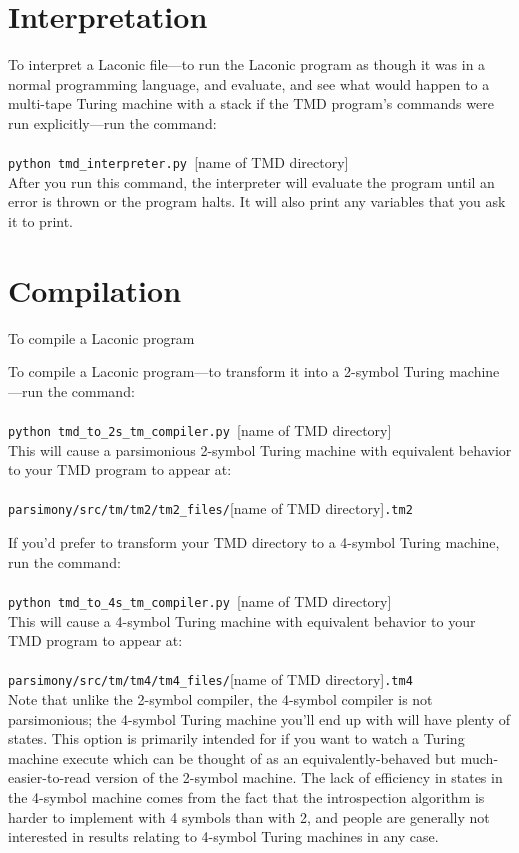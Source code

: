 \documentclass[11pt]{article}
\begin{document}
\section{Interpretation}

To interpret a Laconic file---to run the Laconic program as though it was in a normal programming language, and evaluate, and see what would happen to a multi-tape Turing machine with a stack if the TMD program's commands were run explicitly---run the command: \\ \\ 
\texttt{python tmd_interpreter.py }[name of TMD directory] \\

After you run this command, the interpreter will evaluate the program until an error is thrown or the program halts. It will also print any variables that you ask it to print.

\section{Compilation}

To compile a Laconic program 

To compile a Laconic program---to transform it into a 2-symbol Turing machine---run the command: \\ \\
\texttt{python tmd_to_2s_tm_compiler.py }[name of TMD directory] \\

This will cause a parsimonious 2-symbol Turing machine with equivalent behavior to your TMD program to appear at: \\ \\
\texttt{parsimony/src/tm/tm2/tm2_files/}[name of TMD directory]\texttt{.tm2}

If you'd prefer to transform your TMD directory to a 4-symbol Turing machine, run the command: \\ \\
\texttt{python tmd_to_4s_tm_compiler.py }[name of TMD directory] \\

This will cause a 4-symbol Turing machine with equivalent behavior to your TMD program to appear at: \\ \\
\texttt{parsimony/src/tm/tm4/tm4_files/}[name of TMD directory]\texttt{.tm4} \\

Note that unlike the 2-symbol compiler, the 4-symbol compiler is not parsimonious; the 4-symbol Turing machine you'll end up with will have plenty of states. This option is primarily intended for if you want to watch a Turing machine execute which can be thought of as an equivalently-behaved but much-easier-to-read version of the 2-symbol machine. The lack of efficiency in states in the 4-symbol machine comes from the fact that the introspection algorithm is harder to implement with 4 symbols than with 2, and people are generally not interested in results relating to 4-symbol Turing machines in any case.
\end{document}
